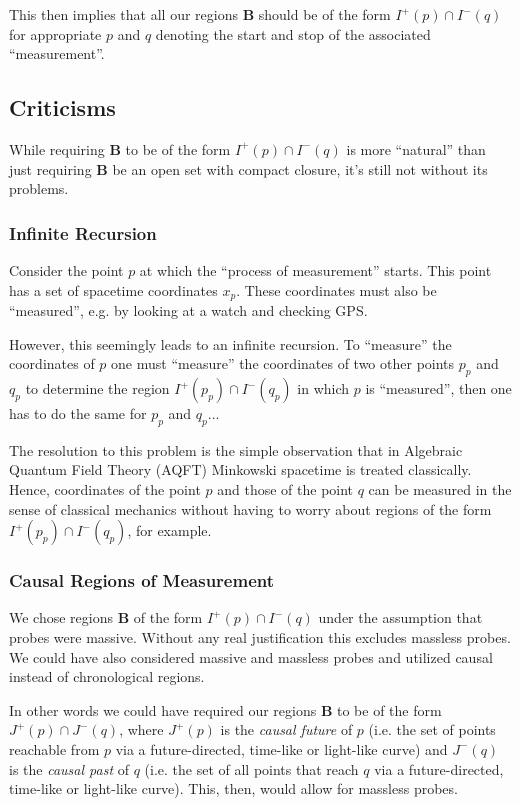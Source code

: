 This then implies that all our regions $\mathbf{B}$ should be of the form $I^+(p) \cap I^-(q)$ for appropriate $p$ and $q$ denoting the start and stop of the associated ``measurement''.


\subsection{Criticisms}
While requiring $\mathbf{B}$ to be of the form $I^+(p) \cap I^-(q)$ is more ``natural'' than just requiring $\mathbf{B}$ be an open set with compact closure, it's still not without its problems.

\subsubsection{Infinite Recursion}
Consider the point $p$ at which the “process of measurement” starts. This point has a set of spacetime coordinates $x_p$. These coordinates must also be ``measured'', e.g. by looking at a watch and checking GPS.

However, this seemingly leads to an infinite recursion. To ``measure'' the coordinates of $p$ one must ``measure'' the coordinates of two other points $p_p$ and $q_p$ to determine the region $I^+(p_p) \cap I^-(q_p)$ in which $p$ is ``measured'', then one has to do the same for $p_p$ and $q_p$...

The resolution to this problem is the simple observation that in Algebraic Quantum Field Theory (AQFT) Minkowski spacetime is treated classically. Hence, coordinates of the point $p$ and those of the point $q$ can be measured in the sense of classical mechanics without having to worry about regions of the form $I^+(p_p) \cap I^-(q_p)$, for example.

\subsubsection{Causal Regions of Measurement}
We chose regions $\mathbf{B}$ of the form $I^+(p) \cap I^-(q)$ under the assumption that probes were massive. Without any real justification this excludes massless probes. We could have also considered massive and massless probes and utilized causal instead of chronological regions.

In other words we could have required our regions $\mathbf{B}$ to be of the form $J^+(p) \cap J^-(q)$, where $J^+(p)$ is the \textit{causal future} of $p$ (i.e. the set of points reachable from $p$ via a future-directed, time-like or light-like curve) and $J^-(q)$ is the \textit{causal past} of $q$ (i.e. the set of all points that reach $q$ via a future-directed, time-like or light-like curve). This, then, would allow for massless probes.

